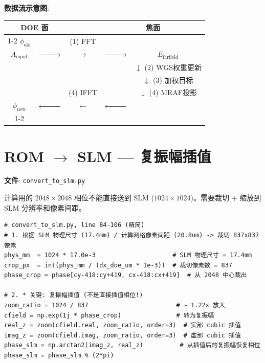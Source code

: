 \documentclass[11pt,a4paper]{ctexart}
\begin{document}
\textbf{数据流示意图}:

\begin{center}
\begin{tabular}{ccccc}
\multicolumn{2}{c}{\textbf{DOE 面}} & & \multicolumn{2}{c}{\textbf{焦面}} \\
\cline{1-2} \cline{4-5}
$\phi_{\text{old}}$ & & (1) FFT & & \\
$A_{\text{input}}$ & $\xrightarrow{\hspace{2.5em}}$ & $\longrightarrow$ & $\xrightarrow{\hspace{2.5em}}$ & $E_{\text{farfield}}$ \\
& & & & $\downarrow$ (2) WGS权重更新 \\
& & & & $\downarrow$ (3) 加权目标 \\
& & (4) IFFT & & $\downarrow$ (4) MRAF投影 \\
$\phi_{\text{new}}$ & $\xleftarrow{\hspace{2.5em}}$ & $\longleftarrow$ & $\xleftarrow{\hspace{2.5em}}$ & \\
\cline{1-2} \cline{4-5}
\end{tabular}
\end{center}

\section{ROM $\rightarrow$ SLM — 复振幅插值}

\textbf{文件}: \texttt{convert\_to\_slm.py}

计算用的 $2048\times2048$ 相位不能直接送到 SLM ($1024\times1024$)。需要裁切 + 缩放到 SLM 分辨率和像素间距。

\begin{lstlisting}
# convert_to_slm.py, line 84-106 (精简)
# 1. 根据 SLM 物理尺寸 (17.4mm) / 计算网格像素间距 (20.8um) -> 裁切 837x837 像素
phys_mm  = 1024 * 17.0e-3                     # SLM 物理尺寸 = 17.4mm
crop_px  = int(phys_mm / (dx_doe_um * 1e-3))  # 裁切像素数 = 837
phase_crop = phase[cy-418:cy+419, cx-418:cx+419]  # 从 2048 中心裁出

# 2. * 关键: 复振幅插值 (不是直接插值相位!)
zoom_ratio = 1024 / 837                        # ~ 1.22x 放大
cfield = np.exp(1j * phase_crop)               # 转为复振幅
real_z = zoom(cfield.real, zoom_ratio, order=3)  # 实部 cubic 插值
imag_z = zoom(cfield.imag, zoom_ratio, order=3)  # 虚部 cubic 插值
phase_slm = np.arctan2(imag_z, real_z)          # 从插值后的复振幅恢复相位
phase_slm = phase_slm % (2*pi)
\end{lstlisting}
\end{document}
